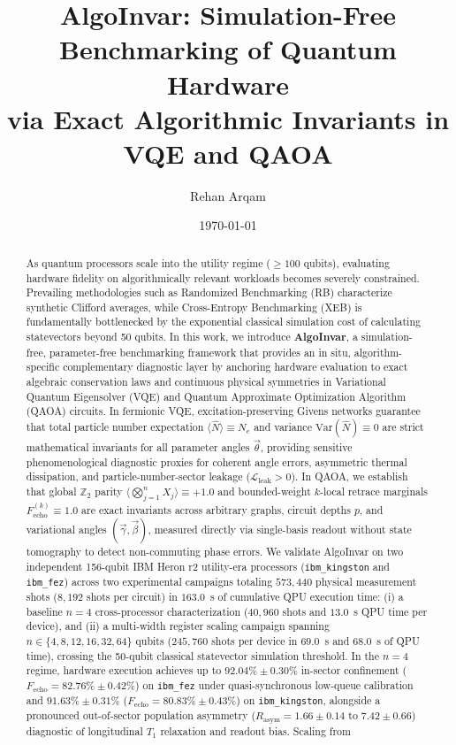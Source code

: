\documentclass[aps,pra,reprint,superscriptaddress,floatfix,nofootinbib]{revtex4-2}
\begin{document}
\title{AlgoInvar: Simulation-Free Benchmarking of Quantum Hardware\texorpdfstring{\\}{ }via Exact Algorithmic Invariants in VQE and QAOA}

\author{Rehan Arqam}

\date{\today}

\begin{abstract}
As quantum processors scale into the utility regime ($\ge 100$ qubits), evaluating hardware fidelity on algorithmically relevant workloads becomes severely constrained. Prevailing methodologies such as Randomized Benchmarking (RB) characterize synthetic Clifford averages, while Cross-Entropy Benchmarking (XEB) is fundamentally bottlenecked by the exponential classical simulation cost of calculating statevectors beyond 50 qubits. In this work, we introduce \textbf{AlgoInvar}, a simulation-free, parameter-free benchmarking framework that provides an in situ, algorithm-specific complementary diagnostic layer by anchoring hardware evaluation to exact algebraic conservation laws and continuous physical symmetries in Variational Quantum Eigensolver (VQE) and Quantum Approximate Optimization Algorithm (QAOA) circuits. In fermionic VQE, excitation-preserving Givens networks guarantee that total particle number expectation $\langle \hat{N} \rangle \equiv N_e$ and variance $\text{Var}(\hat{N}) \equiv 0$ are strict mathematical invariants for all parameter angles $\vec{\theta}$, providing sensitive phenomenological diagnostic proxies for coherent angle errors, asymmetric thermal dissipation, and particle-number-sector leakage ($\mathcal{L}_{\text{leak}} > 0$). In QAOA, we establish that global $\mathbb{Z}_2$ parity $\langle \bigotimes_{j=1}^n X_j \rangle \equiv +1.0$ and bounded-weight $k$-local retrace marginals $F_{\text{echo}}^{(k)} \equiv 1.0$ are exact invariants across arbitrary graphs, circuit depths $p$, and variational angles $(\vec{\gamma}, \vec{\beta})$, measured directly via single-basis readout without state tomography to detect non-commuting phase errors. We validate AlgoInvar on two independent 156-qubit IBM Heron r2 utility-era processors (\texttt{ibm\_kingston} and \texttt{ibm\_fez}) across two experimental campaigns totaling $573,440$ physical measurement shots ($8,192$ shots per circuit) in $163.0$~s of cumulative QPU execution time: (i) a baseline $n = 4$ cross-processor characterization ($40,960$ shots and $13.0$~s QPU time per device), and (ii) a multi-width register scaling campaign spanning $n \in \{4, 8, 12, 16, 32, 64\}$ qubits ($245,760$ shots per device in $69.0$~s and $68.0$~s of QPU time), crossing the 50-qubit classical statevector simulation threshold. In the $n = 4$ regime, hardware execution achieves up to $92.04\% \pm 0.30\%$ in-sector confinement ($F_{\text{echo}} = 82.76\% \pm 0.42\%$) on \texttt{ibm\_fez} under quasi-synchronous low-queue calibration and $91.63\% \pm 0.31\%$ ($F_{\text{echo}} = 80.83\% \pm 0.43\%$) on \texttt{ibm\_kingston}, alongside a pronounced out-of-sector population asymmetry ($R_{\text{asym}} = 1.66 \pm 0.14$ to $7.42 \pm 0.66$) diagnostic of longitudinal $T_1$ relaxation and readout bias. Scaling from 
\end{abstract}
\end{document}
